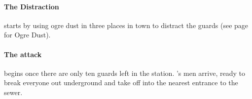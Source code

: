 \begin{multicols}{2}
\paragraph{The Distraction} starts by using ogre dust in three places in town to distract the guards (see page \pageref{ogredust} for Ogre Dust).

\paragraph{The attack}
begins once there are only ten guards left in the station.
's men arrive, ready to break everyone out underground and take off into the nearest entrance to the sewer.


\stopcontents[sq]

\stopcontents[Villages]

\end{multicols}

